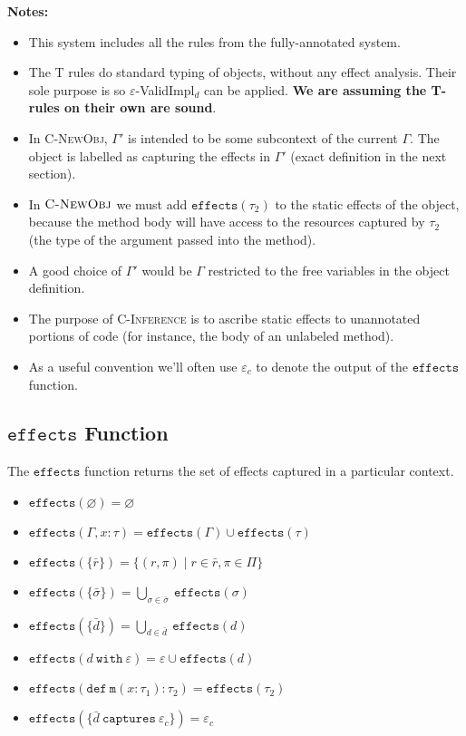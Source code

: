 \documentclass{llncs}
\newcommand{\keywadj}[1]{\mathtt{#1}}
\newcommand{\keyw}[1]{\keywadj{#1}~}
\begin{document}
\noindent \textbf{Notes:}

\begin{itemize}
	\item This system includes all the rules from the fully-annotated system.
	\item The \textsc{T} rules do standard typing of objects, without any effect analysis. Their sole purpose is so $\varepsilon$-ValidImpl$_d$ can be applied. \textbf{We are assuming the T-rules on their own are sound}.
	\item In \textsc{C-NewObj}, $\Gamma'$ is intended to be some subcontext of the current $\Gamma$. The object is labelled as capturing the effects in $\Gamma'$ (exact definition in the next section).
	\item In $\textsc{C-NewObj}$ we must add $\keywadj{effects}(\tau_2)$ to the static effects of the object, because the method body will have access to the resources captured by $\tau_2$ (the type of the argument passed into the method).
	\item A good choice of $\Gamma'$ would be $\Gamma$ restricted to the free variables in the object definition.
	\item The purpose of \textsc{C-Inference} is to ascribe static effects to unannotated portions of code (for instance, the body of an unlabeled method).
	\item As a useful convention we'll often use $\varepsilon_c$ to denote the output of the $\keywadj{effects}$ function.
\end{itemize}

\subsection{$\keywadj{effects}$ Function}

\noindent
The $\keywadj{effects}$ function returns the set of effects captured in a particular context.

\begin{itemize}
	\item $\keywadj{effects}(\varnothing) = \varnothing$
	\item $\keywadj{effects}(\Gamma, x : \tau) = \keywadj{effects}(\Gamma) \cup \keywadj{effects}(\tau)$
	\item $\keywadj{effects}(\{\bar r\}) = \{ (r, \pi) \mid r \in \bar r, \pi \in \Pi \}$
	\item $\keywadj{effects}(\{\bar \sigma\}) = \bigcup_{\sigma \in \bar \sigma}~\keywadj{effects}(\sigma)$
	\item $\keywadj{effects}(\{\bar d\}) = \bigcup_{d \in \bar d}~\keywadj{effects}(d)$
	\item $\keywadj{effects}(d~\keyw{with} \varepsilon) = \varepsilon \cup \keywadj{effects}(d)$
	\item $\keywadj{effects}(\keywadj{def~m}(x : \tau_1) : \tau_2) = \keywadj{effects}(\tau_2)$
	\item $\keywadj{effects}(\{\bar d ~\keyw{captures} \varepsilon_c\}) = \varepsilon_c$
\end{itemize}
\end{document}
